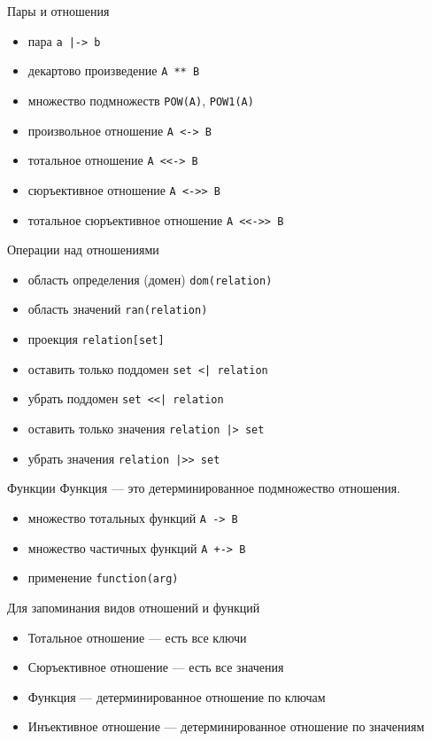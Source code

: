 \documentclass[hyperref={unicode=true}]{beamer}
\begin{document}
	\begin{frame}[fragile]{Пары и отношения}
		\begin{itemize}
			\item пара \verb`a |-> b`
			\item декартово произведение \verb|A ** B|
			\item множество подмножеств \verb|POW(A)|, \verb|POW1(A)|
			\item произвольное отношение \texttt{A <-> B}
			\item тотальное отношение \verb`A <<-> B`
			\item сюръективное отношение \verb`A <->> B`
			\item тотальное сюръективное отношение \verb`A <<->> B`
		\end{itemize}
	\end{frame}

	\begin{frame}[fragile]{Операции над отношениями}
		\begin{itemize}
			\item область определения (домен) \verb|dom(relation)|
			\item область значений \verb|ran(relation)|
			\item проекция \verb|relation[set]|
			\item оставить только поддомен \verb`set <| relation`
			\item убрать поддомен \verb`set <<| relation`
			\item оставить только значения \verb`relation |> set`
			\item убрать значения \verb`relation |>> set`
		\end{itemize}
	\end{frame}

	\begin{frame}[fragile]{Функции}
		Функция --- это детерминированное подмножество отношения.

		\begin{itemize}
			\item множество тотальных функций \verb|A -> B|
			\item множество частичных функций \verb|A +-> B|
			\item применение \verb|function(arg)|
		\end{itemize}
	\end{frame}

    \begin{frame}{Для запоминания видов отношений и функций}
        \begin{itemize}
        \item Тотальное отношение --- есть все ключи
        \item Сюръективное отношение --- есть все значения
        \item Функция --- детерминированное отношение по ключам
        \item Инъективное отношение --- детерминированное отношение по значениям
        \end{itemize}
    \end{frame}
\end{document}
